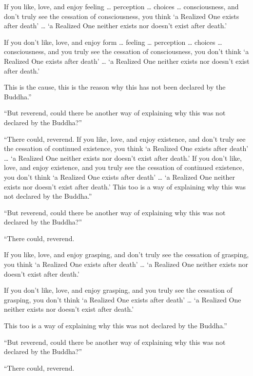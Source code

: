 \documentclass[12pt,openany]{book}%
\begin{document}
If you like, love, and enjoy feeling … perception … choices … consciousness, and don’t truly see the cessation of consciousness, you think ‘a Realized One exists after death’ … ‘a Realized One neither exists nor doesn’t exist after death.’ 

If you don’t like, love, and enjoy form … feeling … perception … choices … consciousness, and you truly see the cessation of consciousness, you don’t think ‘a Realized One exists after death’ … ‘a Realized One neither exists nor doesn’t exist after death.’ 

This is the cause, this is the reason why this has not been declared by the Buddha.” 

“But reverend, could there be another way of explaining why this was not declared by the Buddha?” 

“There could, reverend. If you like, love, and enjoy existence, and don’t truly see the cessation of continued existence, you think ‘a Realized One exists after death’ … ‘a Realized One neither exists nor doesn’t exist after death.’ If you don’t like, love, and enjoy existence, and you truly see the cessation of continued existence, you don’t think ‘a Realized One exists after death’ … ‘a Realized One neither exists nor doesn’t exist after death.’ This too is a way of explaining why this was not declared by the Buddha.” 

“But reverend, could there be another way of explaining why this was not declared by the Buddha?” 

“There could, reverend. 

If you like, love, and enjoy grasping, and don’t truly see the cessation of grasping, you think ‘a Realized One exists after death’ … ‘a Realized One neither exists nor doesn’t exist after death.’ 

If you don’t like, love, and enjoy grasping, and you truly see the cessation of grasping, you don’t think ‘a Realized One exists after death’ … ‘a Realized One neither exists nor doesn’t exist after death.’ 

This too is a way of explaining why this was not declared by the Buddha.” 

“But reverend, could there be another way of explaining why this was not declared by the Buddha?” 

“There could, reverend. 
\end{document}
